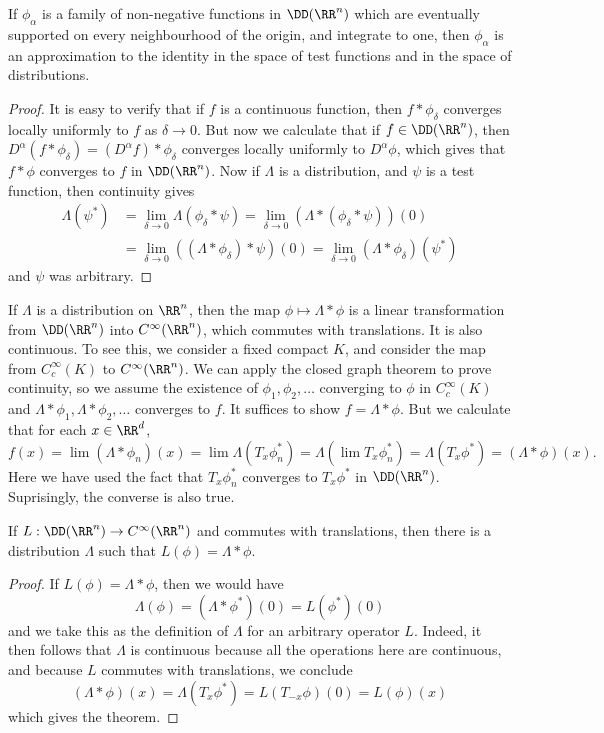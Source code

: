 \begin{theorem}
    If $\phi_\alpha$ is a family of non-negative functions in $\DD(\RR^n)$ which are eventually supported on every neighbourhood of the origin, and integrate to one, then $\phi_\alpha$ is an approximation to the identity in the space of test functions and in the space of distributions.
\end{theorem}
\begin{proof}
    It is easy to verify that if $f$ is a continuous function, then $f * \phi_\delta$ converges locally uniformly to $f$ as $\delta \to 0$. But now we calculate that if $f \in \DD(\RR^n)$, then $D^\alpha(f * \phi_\delta) = (D^\alpha f) * \phi_\delta$ converges locally uniformly to $D^\alpha \phi$, which gives that $f * \phi$ converges to $f$ in $\DD(\RR^n)$. Now if $\Lambda$ is a distribution, and $\psi$ is a test function, then continuity gives
    \begin{align*}
        \Lambda(\psi^*) &= \lim_{\delta \to 0} \Lambda(\phi_\delta * \psi) = \lim_{\delta \to 0} (\Lambda * (\phi_\delta * \psi))(0)\\
        &= \lim_{\delta \to 0} ((\Lambda * \phi_\delta) * \psi)(0) = \lim_{\delta \to 0} (\Lambda * \phi_\delta)(\psi^*)
    \end{align*}
    and $\psi$ was arbitrary.
\end{proof}

If $\Lambda$ is a distribution on $\RR^n$, then the map $\phi \mapsto \Lambda * \phi$ is a linear transformation from $\DD(\RR^n)$ into $C^\infty(\RR^n)$, which commutes with translations. It is also continuous. To see this, we consider a fixed compact $K$, and consider the map from $C_c^\infty(K)$ to $C^\infty(\RR^n)$. We can apply the closed graph theorem to prove continuity, so we assume the existence of $\phi_1, \phi_2, \dots$ converging to $\phi$ in $C_c^\infty(K)$ and $\Lambda * \phi_1, \Lambda * \phi_2, \dots$ converges to $f$. It suffices to show $f = \Lambda * \phi$. But we calculate that for each $x \in \RR^d$,
%
\[ f(x) = \lim (\Lambda * \phi_n)(x) = \lim \Lambda(T_x \phi^*_n) = \Lambda (\lim T_x \phi^*_n) = \Lambda(T_x \phi^*) = (\Lambda * \phi)(x). \]
%
Here we have used the fact that $T_x \phi_n^*$ converges to $T_x \phi^*$ in $\DD(\RR^n)$. Suprisingly, the converse is also true.

\begin{theorem}
    If $L: \DD(\RR^n) \to C^\infty(\RR^n)$ and commutes with translations, then there is a distribution $\Lambda$ such that $L(\phi) = \Lambda * \phi$.
\end{theorem}
\begin{proof}
    If $L(\phi) = \Lambda * \phi$, then we would have
    \[ \Lambda(\phi) = (\Lambda * \phi^*)(0) = L(\phi^*)(0) \]
    and we take this as the definition of $\Lambda$ for an arbitrary operator $L$. Indeed, it then follows that $\Lambda$ is continuous because all the operations here are continuous, and because $L$ commutes with translations, we conclude
    \[ (\Lambda * \phi)(x) = \Lambda(T_x \phi^*) = L(T_{-x} \phi)(0) = L(\phi)(x) \]
    which gives the theorem.
\end{proof}

